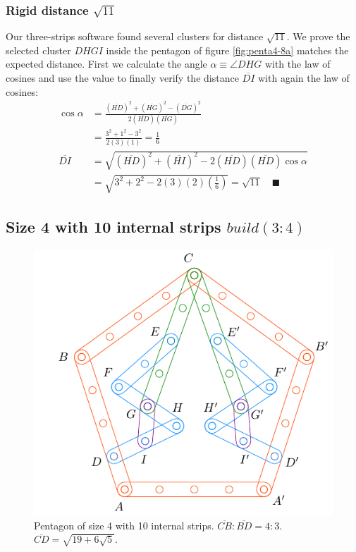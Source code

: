 \documentclass[11pt]{article}
\begin{document}
\subsubsection{Rigid distance $\sqrt{11}$}

Our three-strips software found several clusters for distance $\sqrt{11}$. We prove the selected cluster $DHGI$ inside the pentagon of figure \ref{fig:penta4-8a} matches the expected distance. First we calculate the angle $\alpha \equiv \angle{DHG}$ with the law of cosines and use the value to finally verify the distance $\overline{DI}$ with again the law of cosines:
\begin{align}
\cos\alpha &= \frac{(\overline{HD})^2 + (\overline{HG})^2 - (\overline{DG})^2}
 {2(\overline{HD})(\overline{HG})} \nonumber\\
 &= \frac{3^2 + 1^2 - 3^2}{2(3)(1)} = \frac{1}6 \\
\overline{DI} &= \sqrt{(\overline{HD})^2 + (\overline{HI})^2
 - 2(\overline{HD})(\overline{HD})\cos\alpha} \nonumber\\
 &= \sqrt{3^2 + 2^2 - 2(3)(2)\left(\frac{1}6\right)} = \sqrt{11} \quad\blacksquare
\end{align}

\subsection{Size 4 with 10 internal strips $build(3:4)$}

\begin{figure}[h]
\centering
\includegraphics[scale=1.1]{4/penta4-10a}
\caption{Pentagon of size 4 with 10 internal strips. $\overline{CB} : \overline{BD} = 4:3$. $\overline{CD} = \sqrt{19 + 6\sqrt5}$.}
\label{fig:penta4-10a}
\end{figure}
\end{document}
